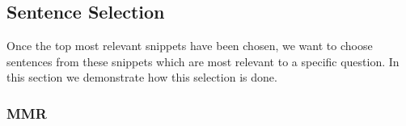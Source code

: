 



\subsection{Sentence Selection}
Once the top most relevant snippets have been chosen, we want to choose sentences from these snippets which are most relevant to a specific question. In this section we demonstrate how this selection is done.

\subsubsection{MMR}

